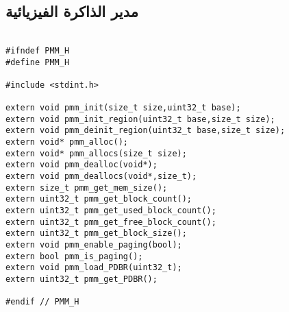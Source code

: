 \documentclass[document.tex]{subfiles}
\begin{document}
\subsection{مدير الذاكرة الفيزيائية}

\begin{english}

\lstset{numberstyle=\tiny,numbers=left,stepnumber=1,numbersep=5pt,tabsize=2,extendedchars=true,breaklines=true,frame=b,showspaces=false, showtabs=false,xleftmargin=10pt,framexleftmargin=10pt,framexrightmargin=5pt,framexbottommargin=4pt,showstringspaces=false,language=C++}

\begin{lstlisting}[label=lst:pmm.h,caption=\en{Physical Memory Manager Interface}]

#ifndef PMM_H
#define PMM_H

#include <stdint.h>

extern void pmm_init(size_t size,uint32_t base);
extern void pmm_init_region(uint32_t base,size_t size);
extern void pmm_deinit_region(uint32_t base,size_t size);
extern void* pmm_alloc();
extern void* pmm_allocs(size_t size);
extern void pmm_dealloc(void*);
extern void pmm_deallocs(void*,size_t);
extern size_t pmm_get_mem_size();
extern uint32_t pmm_get_block_count();
extern uint32_t pmm_get_used_block_count();
extern uint32_t pmm_get_free_block_count();
extern uint32_t pmm_get_block_size();
extern void pmm_enable_paging(bool);
extern bool pmm_is_paging();
extern void pmm_load_PDBR(uint32_t);
extern uint32_t pmm_get_PDBR();

#endif // PMM_H

\end{lstlisting}
\end{english}
\end{document}
